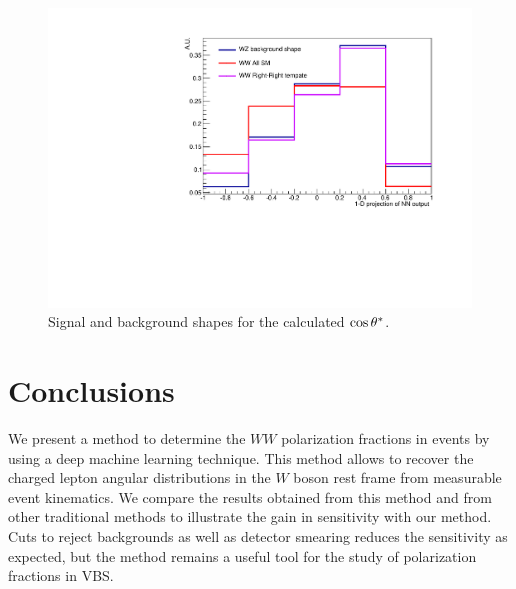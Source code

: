 \begin{figure}
\includegraphics[width=.45\textwidth]{./fig/sig_bkg.pdf}
\caption{\label{sig_bkg} Signal and background shapes for the
  calculated $ \cos \theta^{*}  $.}

\end{figure}

\section{Conclusions}
We present a method to determine the $WW$ polarization fractions in
\ssWW events by using a deep machine learning technique.  This method
allows to recover the charged lepton angular distributions in the $W$
boson rest frame from measurable event kinematics.  We compare the
results obtained from this method and from other traditional methods
to illustrate the gain in sensitivity with our method.  Cuts to reject
backgrounds as well as detector smearing reduces the sensitivity as
expected, but the method remains a useful tool for the study of
polarization fractions in VBS.

\begin{thebibliography}{99}

\end{thebibliography}

